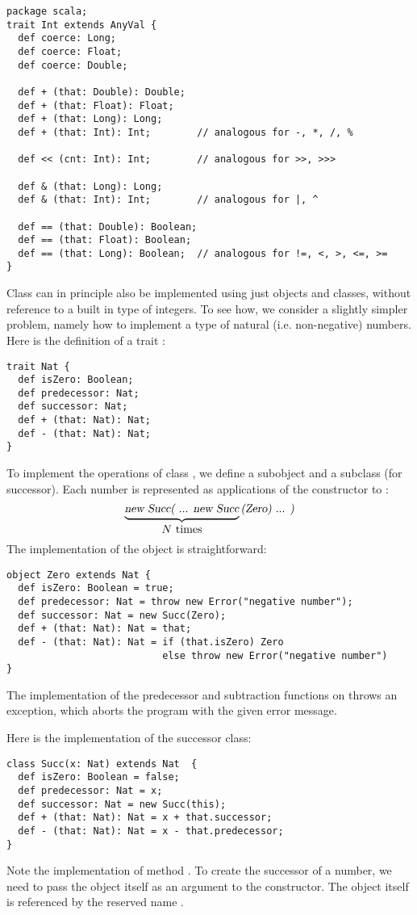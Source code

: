 \documentclass[a4paper,12pt,twoside,titlepage]{book}
\begin{document}
\begin{lstlisting}
package scala;
trait Int extends AnyVal { 
  def coerce: Long;
  def coerce: Float;
  def coerce: Double;

  def + (that: Double): Double;
  def + (that: Float): Float;
  def + (that: Long): Long;
  def + (that: Int): Int;        // analogous for -, *, /, %

  def << (cnt: Int): Int;        // analogous for >>, >>>

  def & (that: Long): Long;
  def & (that: Int): Int;        // analogous for |, ^

  def == (that: Double): Boolean;
  def == (that: Float): Boolean;
  def == (that: Long): Boolean;  // analogous for !=, <, >, <=, >=
}
\end{lstlisting}

Class  can in principle also be implemented using just
objects and classes, without reference to a built in type of
integers. To see how, we consider a slightly simpler problem, namely
how to implement a type  of natural (i.e. non-negative)
numbers. Here is the definition of a trait :
\begin{lstlisting}
trait Nat {
  def isZero: Boolean;
  def predecessor: Nat;
  def successor: Nat;
  def + (that: Nat): Nat;
  def - (that: Nat): Nat;
}
\end{lstlisting}
To implement the operations of class , we define a subobject
 and a subclass  (for successor). Each number
 is represented as  applications of the 
constructor to :
\[
\underbrace{\mbox{\sl new Succ( ... new Succ}}_{\mbox{$N$ times}}\mbox{\sl (Zero) ... )}
\]
The implementation of the  object is straightforward:
\begin{lstlisting}
object Zero extends Nat {
  def isZero: Boolean = true;
  def predecessor: Nat = throw new Error("negative number");
  def successor: Nat = new Succ(Zero);
  def + (that: Nat): Nat = that;
  def - (that: Nat): Nat = if (that.isZero) Zero 
                           else throw new Error("negative number")
}
\end{lstlisting}

The implementation of the predecessor and subtraction functions on
 throws an  exception, which aborts the program
with the given error message.

Here is the implementation of the successor class:
\begin{lstlisting}
class Succ(x: Nat) extends Nat  {
  def isZero: Boolean = false;
  def predecessor: Nat = x;
  def successor: Nat = new Succ(this);
  def + (that: Nat): Nat = x + that.successor;
  def - (that: Nat): Nat = x - that.predecessor;
}
\end{lstlisting}
Note the implementation of method . To create the
successor of a number, we need to pass the object itself as an
argument to the  constructor.  The object itself is
referenced by the reserved name .   
\end{document}
